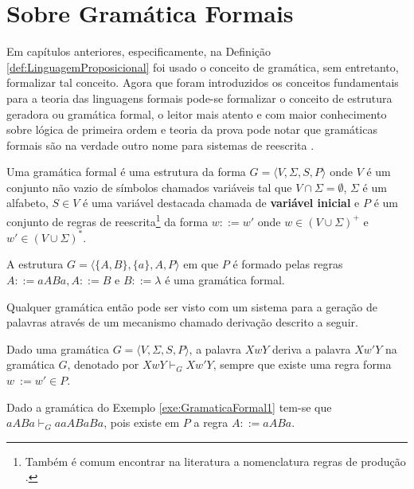 \section{Sobre Gramática Formais}\label{sec:FormalGrammar}

Em capítulos anteriores, especificamente, na Definição \ref{def:LinguagemProposicional} foi usado o conceito de gramática, sem entretanto, formalizar tal conceito. Agora que foram introduzidos os conceitos fundamentais para a teoria das linguagens formais pode-se formalizar o conceito de estrutura geradora ou gramática formal, o leitor mais atento e com maior conhecimento sobre lógica de primeira ordem e teoria da prova \cite{avigad1998, buss1998} pode notar que gramáticas formais são na verdade outro nome para sistemas de reescrita \cite{ayala2014}.

\begin{definicao}\label{def:GramaticaFormal}
	Uma gramática formal é uma estrutura da forma $G = \langle V, \Sigma, S, P \rangle$ onde $V$ é um conjunto não vazio de símbolos chamados variáveis tal que $V \cap \Sigma = \emptyset$, $\Sigma$ é um alfabeto, $S \in V$ é uma variável destacada chamada de \textbf{variável inicial} e $P$ é um conjunto de regras de reescrita\footnote{Também é comum encontrar na literatura a nomenclatura regras de produção \cite{benjaLivro2010, linz2006}.} da forma $w ::= w'$ onde $w \in (V \cup \Sigma)^+$ e $w' \in (V \cup \Sigma)^*$.
\end{definicao}

\begin{exemplo}\label{exe:GramaticaFormal1}
	A estrutura $G = \langle \{A, B\}, \{a\}, A, P \rangle$ em que $P$ é formado pelas regras $A ::= aABa, A ::= B$ e $B ::= \lambda$ é uma gramática formal.
\end{exemplo}

Qualquer gramática então pode ser visto com um sistema para a geração de palavras através de um mecanismo chamado derivação descrito a seguir.

\begin{definicao}
	Dado uma gramática $G = \langle V, \Sigma, S, P \rangle$, a palavra $XwY$ deriva a palavra $Xw'Y$  na gramática $G$, denotado por $XwY \vdash_G Xw'Y$, sempre que existe uma regra forma $w \::= w' \in P$.
\end{definicao}

\begin{exemplo}
	Dado a gramática do Exemplo \ref{exe:GramaticaFormal1} tem-se que $aABa \vdash_G aaABaBa$, pois existe em $P$ a regra $A ::= aABa$.
\end{exemplo}

